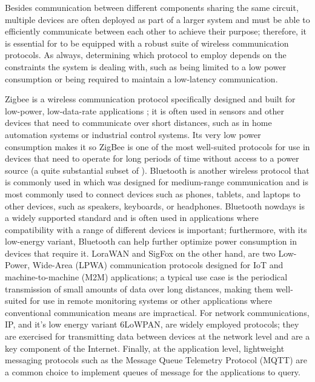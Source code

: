 \noindent Besides communication between different components sharing the same circuit, multiple devices are often deployed as part of a larger system and must be able to efficiently communicate between each other to achieve their purpose; therefore, it is essential for \ess to be equipped with a robust suite of wireless communication protocols. As always, determining which protocol to employ depends on the constraints the system is dealing with, such as being limited to a low power consumption or being required to maintain a low-latency communication.

Zigbee is a wireless communication protocol specifically designed and built for low-power, low-data-rate applications \cite{Zigbee}; it is often used in sensors and other devices that need to communicate over short distances, such as in home automation systems or industrial control systems. Its very low power consumption makes it so ZigBee is one of the most well-suited protocols for use in devices that need to operate for long periods of time without access to a power source (\ie a quite substantial subset of \ess).
Bluetooth is another wireless protocol that is commonly used in \es which was designed for medium-range communication and is most commonly used to connect devices such as phones, tablets, and laptops to other devices, such as speakers, keyboards, or headphones. Bluetooth nowdays is a widely supported standard and is often used in applications where compatibility with a range of different devices is important; furthermore, with its low-energy variant, Bluetooth can help further optimize power consumption in devices that require it.
LoraWAN and SigFox on the other hand, are two Low-Power, Wide-Area (LPWA) communication protocols designed for IoT and machine-to-machine (M2M) applications; a typical use case is the periodical transmission of small amounts of data over long distances, making them well-suited for use in remote monitoring systems or other applications where conventional communication means are impractical.
For network communications, IP, and it's low energy variant 6LoWPAN, are widely employed protocols; they are exercised for transmitting data between devices at the network level and are a key component of the Internet.
Finally, at the application level, lightweight messaging protocols such as the Message Queue Telemetry Protocol (MQTT) are a common choice to implement queues of message for the applications to query.





